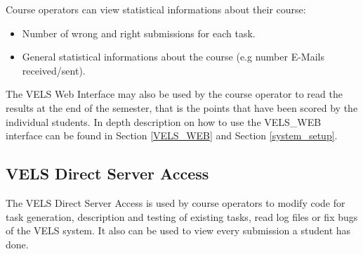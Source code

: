 Course operators can view statistical informations about their course:
\begin{itemize}
\item Number of wrong and right submissions for each task.
\item General statistical informations about the course (e.g number E-Mails received/sent).
\end{itemize}

The VELS Web Interface may also be used by the course operator to read the results at the end of the semester,
that is the points that have been scored by the individual students. In depth description on how to use the 
VELS\_WEB interface can be found in Section \ref{VELS_WEB} and Section \ref{system_setup}.


\subsection{VELS Direct Server Access}\label{directserveraccess}
The VELS Direct Server Access is used by course operators to  modify code for task
generation, description and testing of existing tasks, read log files or fix bugs of the VELS system. 
It also can be used to view every submission a student has done. 

